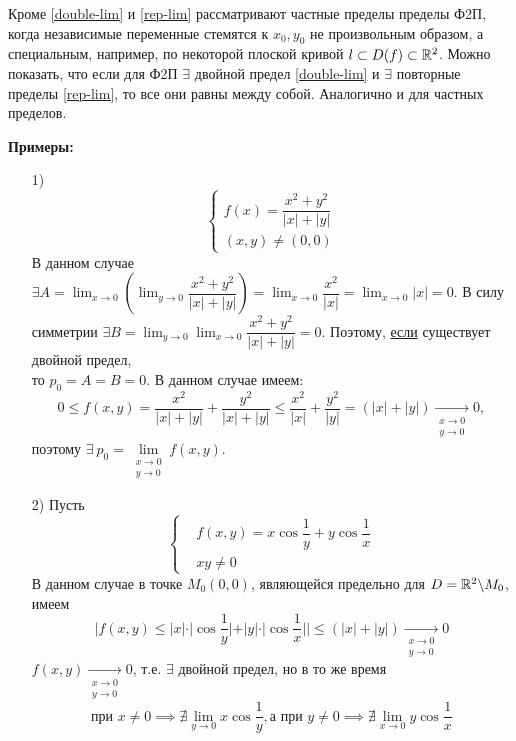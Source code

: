 \documentclass[../../main.tex]{subfiles}
\begin{document}
Кроме \eqref{double-lim} и \eqref{rep-lim} рассматривают частные
пределы пределы Ф2П, когда независимые переменные стемятся к $x_0, y_0$
не произвольным образом, а специальным, например, по некоторой плоской
кривой $l \subset{D(f)} \subset \mathbb{R}^2$. Можно показать, что если для Ф2П
$\exists$ двойной предел \eqref{double-lim} и $\exists$ повторные
пределы \eqref{rep-lim}, то все они равны между собой. Аналогично и
для частных пределов.

\textbf{Примеры:}
\begin{itemize}
	\item[1)] 
	\[\left\{\begin{aligned}
		f(x) = \dfrac{x^2 + y^2}{|x| + |y|} \\
		(x, y) \ne (0, 0)
	\end{aligned}\right.\]
	В данном случае $\exists A = \displaystyle\lim_{x \to 0}
	{(\lim_{y \to 0}{ \dfrac{x^2 + y^2}{|x| + |y|} })} =
	\displaystyle \lim_{x \to 0}{\dfrac{x^2}{|x|}} =
	\displaystyle \lim_{x \to 0}{|x|} = 0$. В силу симметрии
	$\exists B = \displaystyle\lim_{y \to 0}
	{\lim_{x \to 0}{ \dfrac{x^2 + y^2}{|x| + |y|} }} = 0$.
	Поэтому, \underline{если} существует двойной предел, \\
	то $p_0=A=B=0$. В данном случае имеем:
	\[
		0 \leq f(x, y) = 
		\dfrac{x^2}{|x| + |y|} + \dfrac{y^2}{|x| + |y|} \leq
		\dfrac{x^2}{|x|} + \dfrac{y^2}{|y|} = (|x| + |y|) 
		\underset{\substack{x \to 0 \\ y \to 0}}{\longrightarrow}0,
	\]
	поэтому $\exists\ p_0 = \underset{\substack{x \to 0 \\ y \to 0}}
	{\lim}f(x, y)$.
	
	\item[2)] Пусть \[\left\{\begin{aligned}
		&f(x, y) = x \cos{\dfrac{1}{y}} + y \cos{\dfrac{1}{x}} \\
		&xy \ne 0
	\end{aligned}\right.\]
	В данном случае в точке $M_0(0, 0)$, являющейся предельно для
	$D = \mathbb{R}^2 \backslash M_0$, имеем
	\[|f(x, y) \leq |x| \cdot |\cos{\dfrac{1}{y}}| + |y| \cdot 
	|\cos{\dfrac{1}{x}}| | \leq (|x| + |y|) 
	\underset{\substack{x \to 0 \\ y \to 0}}{\longrightarrow}0\]
	$f(x, y) \underset{\substack{x \to 0 \\ y \to 0}}{\longrightarrow}0$, т.е. 
	$\exists$ двойной предел, но в то же время 
	\[\text{при } x \ne 0 \implies \nexists \displaystyle \lim_{y \to 0}
	x \cos{\dfrac{1}{y}}, \text{а при } y \ne 0 \implies
	\nexists \displaystyle \lim_{x \to 0} y \cos{\dfrac{1}{x}}\] 
	

\end{itemize}
\end{document}
